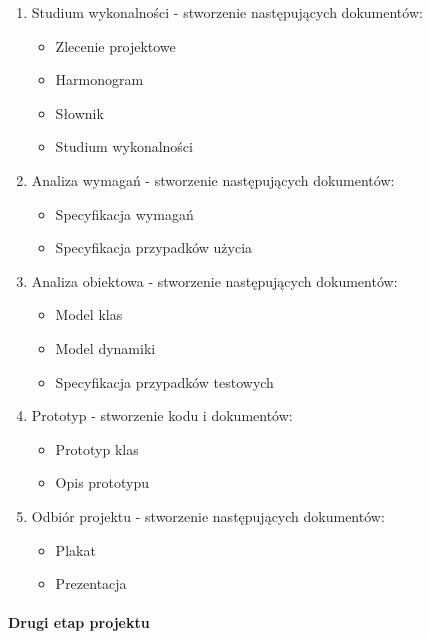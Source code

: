 \begin{enumerate}
 \item Studium wykonalności - stworzenie następujących dokumentów:
	\begin{itemize}
 		\item  Zlecenie projektowe
		\item  Harmonogram
		\item Słownik
		\item Studium wykonalności
	\end{itemize}

\item Analiza wymagań - stworzenie następujących dokumentów:
	\begin{itemize}
 		\item Specyfikacja wymagań
		\item Specyfikacja przypadków użycia
	\end{itemize}


\item Analiza obiektowa - stworzenie następujących dokumentów:
	\begin{itemize}
 		\item Model klas
		\item Model dynamiki
		\item Specyfikacja przypadków testowych
	\end{itemize}

\item Prototyp - stworzenie kodu i dokumentów:
	\begin{itemize}
 		\item Prototyp klas
		\item Opis prototypu
	\end{itemize}

\item Odbiór projektu - stworzenie następujących dokumentów:
	\begin{itemize}
 		\item Plakat
		\item Prezentacja
	\end{itemize}

\end{enumerate}

\paragraph{} \textbf{Drugi etap projektu}

